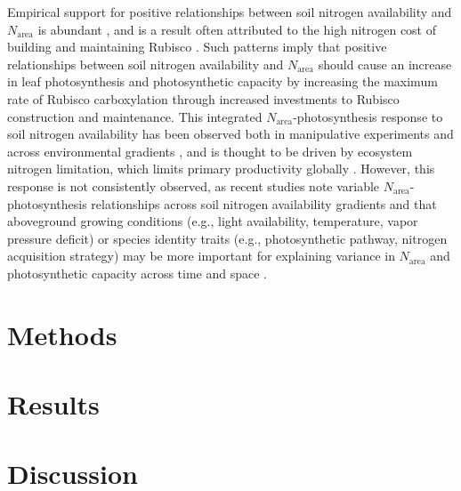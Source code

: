     Empirical support for positive relationships between soil nitrogen availability and $N_\mathrm{area}$ is abundant , and is a result often attributed to the high nitrogen cost of building and maintaining Rubisco . Such patterns imply that positive relationships between soil nitrogen availability and $N_\mathrm{area}$ should cause an increase in leaf photosynthesis and photosynthetic capacity by increasing the maximum rate of Rubisco carboxylation through increased investments to Rubisco construction and maintenance. This integrated $N_\mathrm{area}$-photosynthesis response to soil nitrogen availability has been observed both in manipulative experiments and across environmental gradients , and is thought to be driven by ecosystem nitrogen limitation, which limits primary productivity globally . However, this response is not consistently observed, as recent studies note variable $N_\mathrm{area}$-photosynthesis relationships across soil nitrogen availability gradients  and that aboveground growing conditions (e.g., light availability, temperature, vapor pressure deficit) or species identity traits (e.g., photosynthetic pathway, nitrogen acquisition strategy) may be more important for explaining variance in $N_\mathrm{area}$ and photosynthetic capacity across time and space .

    \section{Methods}





    \section{Results}

    \section{Discussion}